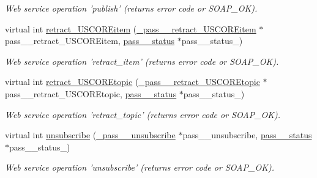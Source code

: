 \begin{DoxyCompactItemize}
\begin{DoxyCompactList}\small\item\em Web service operation 'publish' (returns error code or SOAP\_\-OK). \item\end{DoxyCompactList}\item 
\hypertarget{classPASSSubscriberPortBindingProxy_adef898f1259073e50770624b65e6eba4}{
virtual int \hyperlink{classPASSSubscriberPortBindingProxy_adef898f1259073e50770624b65e6eba4}{retract\_\-USCOREitem} (\hyperlink{class__pass____retract__USCOREitem}{\_\-pass\_\-\_\-retract\_\-USCOREitem} $\ast$pass\_\-\_\-retract\_\-USCOREitem, \hyperlink{classpass____status}{pass\_\-\_\-status} $\ast$pass\_\-\_\-status\_\-)}
\label{classPASSSubscriberPortBindingProxy_adef898f1259073e50770624b65e6eba4}

\begin{DoxyCompactList}\small\item\em Web service operation 'retract\_\-item' (returns error code or SOAP\_\-OK). \item\end{DoxyCompactList}\item 
\hypertarget{classPASSSubscriberPortBindingProxy_ad7f95b934fe94dc3296b65b8c558e3f7}{
virtual int \hyperlink{classPASSSubscriberPortBindingProxy_ad7f95b934fe94dc3296b65b8c558e3f7}{retract\_\-USCOREtopic} (\hyperlink{class__pass____retract__USCOREtopic}{\_\-pass\_\-\_\-retract\_\-USCOREtopic} $\ast$pass\_\-\_\-retract\_\-USCOREtopic, \hyperlink{classpass____status}{pass\_\-\_\-status} $\ast$pass\_\-\_\-status\_\-)}
\label{classPASSSubscriberPortBindingProxy_ad7f95b934fe94dc3296b65b8c558e3f7}

\begin{DoxyCompactList}\small\item\em Web service operation 'retract\_\-topic' (returns error code or SOAP\_\-OK). \item\end{DoxyCompactList}\item 
\hypertarget{classPASSSubscriberPortBindingProxy_ade2d8340f48406a93efdd2df73d500ce}{
virtual int \hyperlink{classPASSSubscriberPortBindingProxy_ade2d8340f48406a93efdd2df73d500ce}{unsubscribe} (\hyperlink{class__pass____unsubscribe}{\_\-pass\_\-\_\-unsubscribe} $\ast$pass\_\-\_\-unsubscribe, \hyperlink{classpass____status}{pass\_\-\_\-status} $\ast$pass\_\-\_\-status\_\-)}
\label{classPASSSubscriberPortBindingProxy_ade2d8340f48406a93efdd2df73d500ce}

\begin{DoxyCompactList}\small\item\em Web service operation 'unsubscribe' (returns error code or SOAP\_\-OK). \item\end{DoxyCompactList}\end{DoxyCompactItemize}
